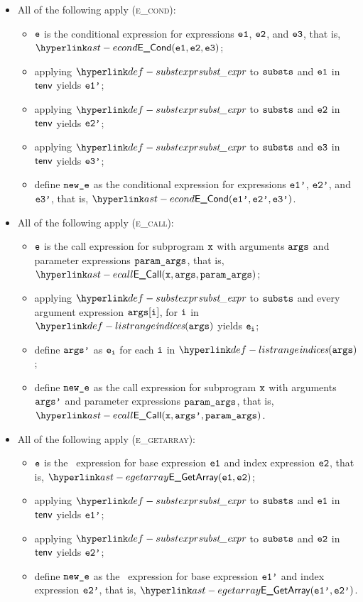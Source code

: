 \begin{itemize}
  \item All of the following apply (\textsc{e\_cond}):
  \begin{itemize}
    \item $\texttt{e}$ is the conditional expression for expressions $\texttt{e1}$, $\texttt{e2}$, and $\texttt{e3}$, that is, \\
          $\ECond(\veone, \vetwo, \vethree)$;
    \item applying $\substexpr$ to $\texttt{substs}$ and $\texttt{e1}$ in $\textsf{tenv}$ yields $\texttt{e1'}$;
    \item applying $\substexpr$ to $\texttt{substs}$ and $\texttt{e2}$ in $\textsf{tenv}$ yields $\texttt{e2'}$;
    \item applying $\substexpr$ to $\texttt{substs}$ and $\texttt{e3}$ in $\textsf{tenv}$ yields $\texttt{e3'}$;
    \item define $\texttt{new\_e}$ as the conditional expression for expressions $\texttt{e1'}$, $\texttt{e2'}$, and $\texttt{e3'}$, that is, $\ECond(\veonep, \vetwop, \vethreep)$.
  \end{itemize}

  \item All of the following apply (\textsc{e\_call}):
  \begin{itemize}
    \item $\texttt{e}$ is the call expression for subprogram $\texttt{x}$ with arguments $\texttt{args}$ and parameter expressions $\texttt{param\_args}$,
          that is, $\ECall(\vx, \vargs, \paramargs)$;
    \item applying $\substexpr$ to $\texttt{substs}$ and every argument expression $\texttt{args}[\texttt{i}]$, for $\texttt{i}$ in
          $\listrange(\vargs)$ yields $\texttt{e}_{\texttt{i}}$;
    \item define $\texttt{args'}$ as $\texttt{e}_{\texttt{i}}$ for each $\texttt{i}$ in $\listrange(\vargs)$;
    \item define $\texttt{new\_e}$ as the call expression for subprogram $\texttt{x}$ with arguments $\texttt{args'}$ and parameter expressions $\texttt{param\_args}$,
    that is, $\ECall(\vx, \vargsp, \paramargs)$.
  \end{itemize}

  \item All of the following apply (\textsc{e\_getarray}):
  \begin{itemize}
    \item $\texttt{e}$ is the \arrayaccess\ expression for base expression $\texttt{e1}$ and index expression $\texttt{e2}$,
          that is, $\EGetArray(\veone, \vetwo)$;
    \item applying $\substexpr$ to $\texttt{substs}$ and $\texttt{e1}$ in $\textsf{tenv}$ yields $\texttt{e1'}$;
    \item applying $\substexpr$ to $\texttt{substs}$ and $\texttt{e2}$ in $\textsf{tenv}$ yields $\texttt{e2'}$;
    \item define $\texttt{new\_e}$ as the \arrayaccess\ expression for base expression $\texttt{e1'}$ and index expression $\texttt{e2'}$,
    that is, $\EGetArray(\veonep, \vetwop)$.
  \end{itemize}


\end{itemize}
